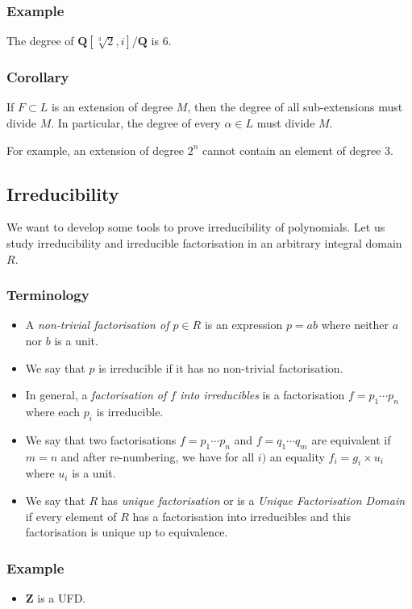 \documentclass[11pt]{article}
\begin{document}
\subsubsection{Example}
\label{sec:orgda024cd}
The degree of \(\mathbf{Q}[\sqrt[3]2, i] / \mathbf{Q}\) is 6.
\subsubsection{Corollary}
\label{sec:orgcc881f0}
If \(F \subset L\) is an extension of degree \(M\), then the degree of all sub-extensions must divide \(M\).
In particular, the degree of every \(\alpha \in L\) must divide \(M\).

For example, an extension of degree \(2^{n}\) cannot contain an element of degree 3.
\subsection{Irreducibility}
\label{sec:org3b86a01}
We want to develop some tools to prove irreducibility of polynomials.
Let us study irreducibility and irreducible factorisation in an arbitrary integral domain \(R\).
\subsubsection{Terminology}
\label{sec:org50645e1}
\begin{itemize}
\item A \emph{non-trivial factorisation of \(p \in R\)} is an expression \(p = ab\) where neither \(a\) nor \(b\) is a unit.
\item We say that \(p\) is irreducible if it has no non-trivial factorisation.
\item In general, a \emph{factorisation of \(f\) into irreducibles} is a factorisation \(f = p_1 \cdots p_n\) where each \(p_{i}\) is irreducible.
\item We say that two factorisations \(f = p_1 \cdots p_{n}\) and \(f = q_1 \cdots q_{m}\) are equivalent if \(m = n\) and after re-numbering, we have for all \(i)\) an equality \(f_i = g_i \times u_i\) where \(u_i\) is a unit.
\item We say that \(R\) has \emph{unique factorisation} or is a \emph{Unique Factorisation Domain} if every element of \(R\) has a factorisation into irreducibles and this factorisation is unique up to equivalence.
\end{itemize}
\subsubsection{Example}
\label{sec:org98b028c}
\begin{itemize}
\item \(\mathbf{Z}\) is a UFD.
\end{itemize}
\end{document}
